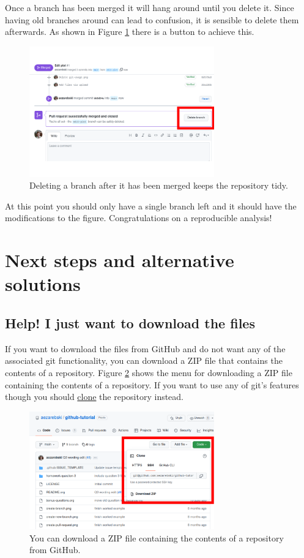 \documentclass[11pt,onecolumn]{scrartcl}
\begin{document}
Once a branch has been merged it will hang around until you delete it. Since
having old branches around can lead to confusion, it is sensible to delete them
afterwards. As shown in Figure \ref{fig:delete-branch} there is a button to achieve
this.

\begin{figure}[htbp]
\centering
\includegraphics[width=8cm]{./delete-branch.png}
\caption{\label{fig:delete-branch}Deleting a branch after it has been merged keeps the repository tidy.}
\end{figure}

At this point you should only have a single branch left and it should have the
modifications to the figure. Congratulations on a reproducible analysis!

\section{Next steps and alternative solutions}
\label{sec:orge3fb595}

\subsection{Help! I just want to download the files}
\label{sec:org80479c8}

If you want to download the files from GitHub and do not want any of the
associated git functionality, you can download a ZIP file that contains the
contents of a repository. Figure \ref{fig:download-zip-file} shows the menu for
downloading a ZIP file containing the contents of a repository. If you want to
use any of git's features though you should \hyperref[sec:org4ed5260]{clone} the repository instead.

\begin{figure}[htbp]
\centering
\includegraphics[width=8cm]{./download-zip-file.png}
\caption{\label{fig:download-zip-file}You can download a ZIP file containing the contents of a repository from GitHub.}
\end{figure}
\end{document}
